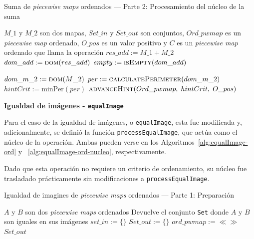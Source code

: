 \begin{algorithm}
\caption{Suma de \textit{piecewise maps} ordenados — Parte 2: Procesamiento del núcleo de la suma}
\label{alg:suma-ord-nucleo}
\begin{algorithmic}[1]
\Require $M\_1$ y $M\_2$ son dos mapas, $Set\_in$ y $Set\_out$ son conjuntos, $Ord\_pwmap$ es un \textit{piecewise map} ordenado, $O\_pos$ es un valor positivo y $C$ es un \textit{piecewise map} ordenado que llama la operación
    \State $res\_add := M\_1 + M\_2$
    \State $dom\_add := \Call{dom}{res\_add}$
    \State $empty := \Call{isEmpty}{dom\_add}$

        \State $dom\_m\_2 := \Call{dom}{M\_2}$
        \State $per := \Call{calculatePerimeter}{dom\_m\_2}$
        \State $hintCrit := \mathrm{minPer}(per)$
        \State $\Call{advanceHint}{Ord\_pwmap,\;hintCrit,\;O\_pos}$
        \State {}
    \EndIf
    \State \Return
\EndFunction
\end{algorithmic}
\end{algorithm}

{\bf Igualdad de imágenes - \texttt{equalImage}}

Para el caso de la igualdad de imágenes, o \texttt{equalImage}, esta fue modificada y, adicionalmente, se definió la función \texttt{processEqualImage}, que actúa como el núcleo de la operación. Ambas pueden verse en los Algoritmos~\ref{alg:equalImage-ord} y ~\ref{alg:equalImage-ord-nucleo}, respectivamente.

Dado que esta operación no requiere un criterio de ordenamiento, su núcleo fue trasladado prácticamente sin modificaciones a \texttt{processEqualImage}.

\begin{algorithm}
\caption{Igualdad de imagines de \textit{piecewise maps} ordenados — Parte 1: Preparación}
\label{alg:equalImage-ord}
\begin{algorithmic}[1]
\Require $A$ y $B$ son dos \textit{piecewise maps} ordenados
\Ensure Devuelve el conjunto \texttt{Set} donde $A$ y $B$ son iguales en sus imágenes
    \State $set\_in := \{\}$
    \State $Set\_out := \{\}$
    \State $ord\_pwmap := \ll\gg$
    \State {}
    \State \Return $Set\_out$
\EndFunction
\end{algorithmic}
\end{algorithm}

